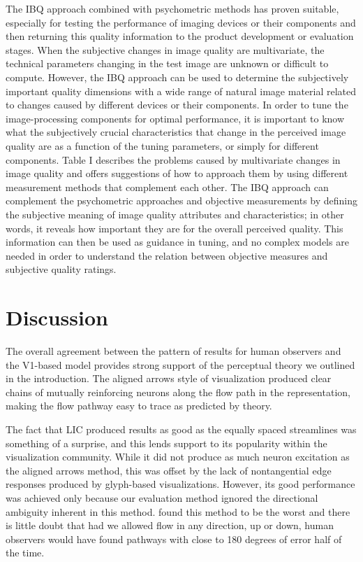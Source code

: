 \documentclass[prodmode,acmtap]{acmlarge}
\begin{document}
The IBQ approach combined with psychometric methods has proven suitable,
especially for testing the performance of imaging devices or their
components and then returning this quality information to the product
development or evaluation stages. When the subjective changes in image
quality are multivariate, the technical parameters changing in the test
image are unknown or difficult to compute. However, the IBQ approach can be
used to determine the subjectively important quality dimensions with a wide
range of natural image material related to changes caused by different
devices or their components. In order to tune the image-processing
components for optimal performance, it is important to know what the
subjectively crucial characteristics that change in the perceived image
quality are as a function of the tuning parameters, or simply for different
components. Table I describes the problems caused by multivariate changes in
image quality and offers suggestions of how to approach them by using
different measurement methods that complement each other. The IBQ approach
can complement the psychometric approaches and objective measurements by
defining the subjective meaning of image quality attributes and
characteristics; in other words, it reveals how important they are for the
overall perceived quality. This information can then be used as guidance in
tuning, and no complex models are needed in order to understand the relation
between objective measures and subjective quality ratings.

\section{Discussion}
The overall agreement between the pattern of results for human
observers and the V1-based model provides strong support of the
perceptual theory we outlined in the introduction. The aligned arrows
style of visualization produced clear chains of mutually reinforcing
neurons along the flow path in the representation, making the flow
pathway easy to trace as predicted by theory.

The fact that LIC produced results as good as the equally spaced
streamlines was something of a surprise, and this lends support to
its popularity within the visualization community. While it did not
produce as much neuron excitation as the aligned arrows method, this
was offset by the lack of nontangential edge responses produced by
glyph-based visualizations. However, its good performance was
achieved only because our evaluation method ignored the directional
ambiguity inherent in this method.  found this
method to be the worst and there is little doubt that had we allowed
flow in any direction, up or down, human observers would have found
pathways with close to 180 degrees of error half of the time.
\end{document}
